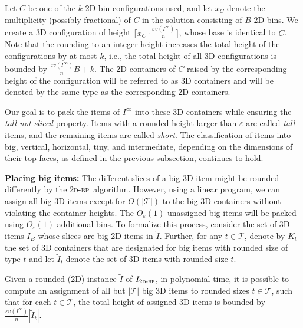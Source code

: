 \documentclass[a4paper,UKenglish,cleveref, autoref, thm-restate]{lipics-v2021}
\newcommand{\eps}{\varepsilon}
\newcommand{\twobp}{\textsc{2d-bp}\xspace}
\newcommand{\bigy}{big\xspace}
\begin{document}
Let $C$ be one of the $k$ 2D bin configurations used, and let $x_C$ denote the multiplicity (possibly fractional) of $C$ in the solution consisting of $B$ 2D bins.
We create a 3D configuration of height $\lceil x_C \cdot \frac{\eps v(I^{\infty})}{n}\rceil$, whose base is identical to $C$. 
Note that the rounding to an integer height increases the total height of the configurations by at most $k$, i.e., the total height of all 3D configurations is bounded by $\frac{\eps v(I^{\infty})}{n}B+k$.
The 2D containers of $C$ raised by the corresponding height of the configuration will be referred to as 3D containers and will be denoted by the same type as the corresponding 2D containers.

Our goal is to pack the items of $I^{\infty}$ into these 3D containers while ensuring the \emph{tall-not-sliced} property. Items with a rounded height larger than $\eps$ are called \emph{tall} items, and the remaining items are called \emph{short}. The classification of items into big, vertical, horizontal, tiny, and intermediate, depending on the dimensions of their top faces, as defined in the previous subsection, continues to hold.

{\bf Placing big items:} 
The different slices of a \bigy 3D item might be rounded differently by the \twobp~algorithm. 
However, using a linear program, we can assign all big 3D items except for $O(|\mathcal{T}|)$ to the big 3D containers without violating the container heights.
The $O_{\eps}(1)$ unassigned big items will be packed using $O_{\eps}(1)$ additional bins. 
To formalize this process,
consider the set of 3D items $I_B$ whose slices are \bigy 2D items in $\tilde{I}$.
Further, for any $t \in \mathcal{T}$, denote by $K_t$ the set of 3D containers that are designated for \bigy items with rounded size of type $t$ and let $\tilde{I}_t$ denote the set of 3D items with rounded size $t$.


\begin{lemma}
\label{lem:frist-setp-big-items}
Given a rounded (2D) instance $\tilde{I}$ of $I_{\twobp}$,
in polynomial time, it is possible to compute an assignment of all but $|\mathcal{T}|$ \bigy 3D items to rounded sizes $t \in \mathcal{T}$, such that for each $t \in \mathcal{T}$, the total height of assigned 3D items is bounded by $\frac{\eps v(I^{\infty})}{n} |\tilde{I}_t|$.
\end{lemma}
\end{document}
